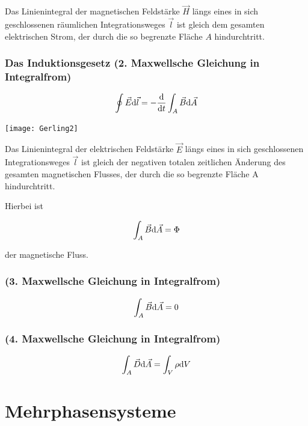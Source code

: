 Das Linienintegral der magnetischen Feldstärke $\vec{H}$ längs eines in sich geschlossenen räumlichen Integrationsweges $\vec{l}$ ist gleich dem gesamten elektrischen Strom, der durch die so begrenzte Fläche $A$ hindurchtritt.

\subsubsection{Das Induktionsgesetz (2. Maxwellsche Gleichung in Integralfrom)}

\begin{minipage}{0.5\textwidth}
\begin{align}
	\oint \vec{E}\mathrm{d}\vec{l} = -\frac{\mathrm{d}}{\mathrm{d}t}\int_A \vec{B}\mathrm{d}\vec{A}
\end{align}
\end{minipage}
\begin{minipage}{0.5\textwidth}
	\texttt{[image: Gerling2]}
\end{minipage}


Das Linienintegral der elektrischen Feldstärke $\vec{E}$ längs eines in sich geschlossenen Integrationsweges $\vec{l}$ ist gleich der negativen totalen zeitlichen Änderung des gesamten magnetischen Flusses, der durch die so begrenzte Fläche A hindurchtritt.

Hierbei ist

\begin{align}
\int_A \vec{B}\mathrm{d}\vec{A} = \Phi
\end{align}

der magnetische Fluss.

\subsubsection{(3. Maxwellsche Gleichung in Integralfrom)}

\begin{align}
\int_A \vec{B}\mathrm{d}\vec{A} = 0
\end{align}

\subsubsection{(4. Maxwellsche Gleichung in Integralfrom)}

\begin{align}
\int_A \vec{D}\mathrm{d}\vec{A} = \int_V\rho\mathrm{d}V
\end{align}

\section{Mehrphasensysteme}
\label{subsec:mehrphasensysteme}

